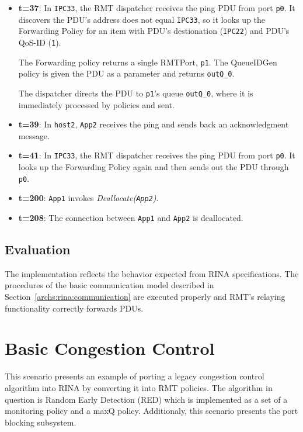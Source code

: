 \begin{itemize}
            \item \textbf{t=37}: In \texttt{IPC33}, the RMT dispatcher receives the ping PDU from port \texttt{p0}. It discovers the PDU's address does not equal \texttt{IPC33}, so it looks up the Forwarding Policy for an item with PDU's destionation (\texttt{IPC22}) and PDU's QoS-ID (\texttt{1}).

            The Forwarding policy returns a single RMTPort, \texttt{p1}. The QueueIDGen policy is given the PDU as a parameter and returns \texttt{outQ\_0}.

            The dispatcher directs the PDU to \texttt{p1}'s queue \texttt{outQ\_0}, where it is immediately processed by policies and sent.

            \item \textbf{t=39}: In \texttt{host2}, \texttt{App2} receives the ping and sends back an acknowledgment message.

            \item \textbf{t=41}: In \texttt{IPC33}, the RMT dispatcher receives the ping PDU from port \texttt{p0}. It looks up the Forwarding Policy again and then sends out the PDU through \texttt{p0}.

            \item \textbf{t=200}: \texttt{App1} invokes \emph{Deallocate(\texttt{App2})}.

            \item \textbf{t=208}: The connection between \texttt{App1} and \texttt{App2} is deallocated.
            \end{itemize}

        \subsection{Evaluation}

            The implementation reflects the behavior expected from RINA specifications. The procedures of the basic communication model described in Section~\ref{archs:rina:communication} are executed properly and RMT's relaying functionality correctly forwards PDUs.


    \section{Basic Congestion Control}

        This scenario presents an example of porting a legacy congestion control algorithm into RINA by converting it into RMT policies. The algorithm in question is Random Early Detection (RED) which is implemented as a set of a monitoring policy and a maxQ policy. Additionaly, this scenario presents the port blocking subsystem.

